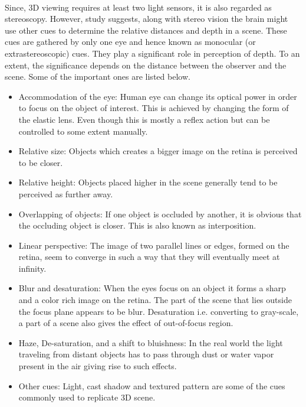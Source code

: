 \paragraph{}
Since, 3D viewing requires at least two light sensors, it is also regarded as stereoscopy. However, study
\cite{bib:stereo_cue} suggests, along with stereo vision the brain might use other cues to determine the relative distances and depth in a scene. These cues are gathered by only one eye and hence known as monocular (or extrastereoscopic) cues. They play a significant role in perception of depth. To an extent, the significance  depends on the distance between the observer and the scene. Some of the important ones are listed below.

\begin{itemize}
  \item Accommodation of the eye: Human eye can change its optical power in order to focus on the object of interest. This is achieved by changing the form of the elastic lens. Even though this is mostly a reflex action but can be controlled to some extent manually.
  
  \item Relative size: Objects which creates a bigger image on the retina is perceived to be closer.
  
  \item Relative height: Objects placed higher in the scene generally tend to be perceived as further away.
  
	\item Overlapping of objects: If one object is occluded by another, it is obvious that the occluding object is closer. This is also known as interposition.
		
	\item Linear perspective: The image of two parallel lines or edges, formed on the retina, seem to converge in such a way that they will eventually meet at infinity.
	
	\item Blur and desaturation: When the eyes focus on an object it forms a sharp and a color rich image on the retina. The part of the scene that lies outside the focus plane appears to be blur. Desaturation i.e. converting to gray-scale, a part of a scene also gives the effect of out-of-focus region.
	
	\item Haze, De-saturation, and a shift to bluishness: In the real world the light traveling from distant objects has to pass through dust or water vapor present in the air giving rise to such effects.
	
	\item Other cues: Light, cast shadow and textured pattern are some of the cues commonly used to replicate 3D scene.
	
\end{itemize}


